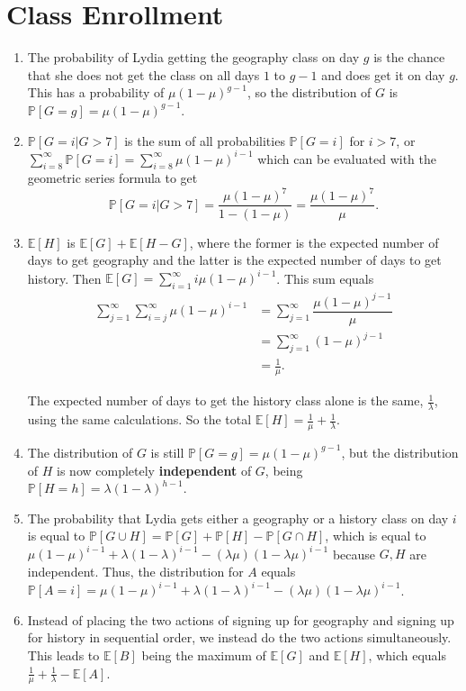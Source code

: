 \documentclass{article}
\newcommand{\p}{\mathbb{P}}
\begin{document}
\section{Class Enrollment}
\begin{enumerate}[label=(\alph*)]
	\item The probability of Lydia getting the geography class on day $g$ is 
	the chance that she does not get the class on all days $1$ to $g-1$ and 
	does get it on day $g$. This has a probability of $\mu (1-\mu)^{g-1}$, so 
	the distribution of $G$ is $\boxed{\p[G = g] = \mu (1-\mu)^{g-1}}$.  
	\item $\p[G = i | G > 7]$ is the sum of all probabilities $\p[G = i]$ for 
	$i > 7$, or $\sum_{i=8}^{\infty} \p[G = i] = \sum_{i=8}^{\infty} \mu (1-\mu)^{i-1}$
	which can be evaluated with the geometric series formula to get 
	\[\p[G = i | G > 7] = \frac{\mu(1-\mu)^7}{1-(1-\mu)} = 
		\boxed{\frac{\mu(1-\mu)^7}{\mu}}.\] 
	\item $\mathbb{E}[H]$ is $\mathbb{E}[G] + \mathbb{E}[H-G]$, where the former 
	is the expected number of days to get geography and the latter is the expected 
	number of days to get history. Then $\mathbb{E}[G] = \sum_{i=1}^\infty i\mu(1-\mu)^{i-1}$. 
	This sum equals 
	\begin{align*} 
		\sum_{j=1}^\infty \sum_{i=j}^\infty \mu(1-\mu)^{i-1} &= 
		\sum_{j=1}^\infty \dfrac{\mu(1-\mu)^{j-1}}{\mu} \\
		&= \sum_{j=1}^\infty (1-\mu)^{j-1} \\
		&= \frac{1}{\mu}.
	\end{align*}
	
	The expected number of days to get the history class alone is the same, 
	$\frac{1}{\lambda}$, using the same calculations.
	So the total $\mathbb{E}[H] = \boxed{\frac{1}{\mu} + \frac{1}{\lambda}}$.

	\item The distribution of $G$ is still $\p[G = g] = \mu (1-\mu)^{g-1}$,
	but the distribution of $H$ is now completely \textbf{independent} of $G$,
	being $\boxed{\p[H = h] = \lambda (1 - \lambda)^{h-1}}$. 
	\item The probability that Lydia gets either a geography or a history class on day $i$ is equal to $\p[G \cup H] = \p[G] + \p[H] - \p[G \cap H]$, which is equal to $\mu(1-\mu)^{i-1} + \lambda(1-\lambda)^{i-1} - (\lambda \mu) (1 - \lambda \mu)^{i-1}$ because $G, H$ are independent. Thus, the distribution for $A$ equals $\p[A = i] = \boxed{\mu(1-\mu)^{i-1} + \lambda(1-\lambda)^{i-1} - (\lambda \mu) (1 - \lambda \mu)^{i-1}}$.
	\item Instead of placing the two actions of signing up for geography and signing up for history in sequential order, we instead do the two actions simultaneously. This leads to $\mathbb{E}[B]$ being the maximum of $\mathbb{E}[G]$ and $\mathbb{E}[H]$, which equals $\frac{1}{\mu} + \frac{1}{\lambda} - \mathbb{E}[A]$. 


\end{enumerate}
\end{document}
